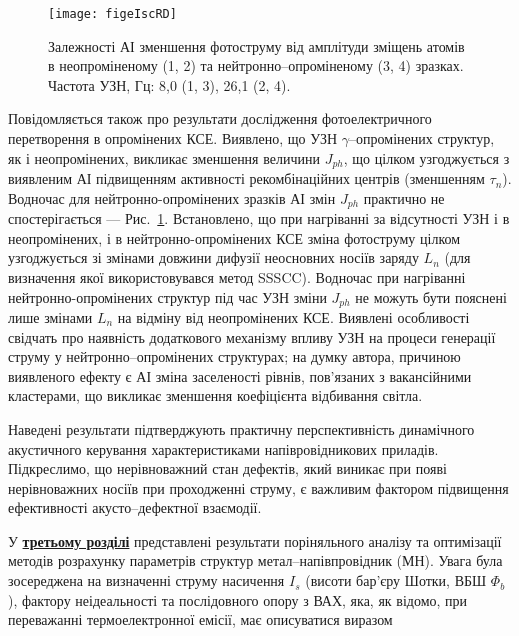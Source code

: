 \documentclass[a5paper,10pt,twoside,openany,article]{memoir} %
\begin{document}
\begin{figure}[hb]
\center
\texttt{[image: figeIscRD]}
\caption{\label{figeIscRD}
Залежності АІ зменшення фотоструму від
амплітуди зміщень атомів в неопроміненому (1, 2)
та нейтронно--опроміненому (3, 4) зразках.
Частота УЗН, Гц: 8,0 (1, 3),
26,1 (2, 4).
}%
\end{figure}
Повідомляється також про результати дослідження фотоелектричного перетворення в опромінених КСЕ.
Виявлено, що УЗН $\gamma$--опромінених структур, як і неопромінених, викликає зменшення величини $J_{ph}$, що цілком
узгоджується з виявленим АІ підвищенням активності рекомбінаційних центрів (зменшенням $\tau_n$).
Водночас для нейтронно-опромінених зразків АІ змін $J_{ph}$ практично не спостерігається --- Рис.~\ref{figeIscRD}.
Встановлено, що при нагріванні за відсутності УЗН і в неопромінених, і в нейтронно-опромінених КСЕ зміна фотоструму
цілком узгоджується зі змінами довжини дифузії неосновних носіїв заряду $L_n$ (для визначення якої використовувався метод SSSCC).
Водночас при нагріванні нейтронно-опромінених структур під час УЗН зміни $J_{ph}$ не можуть бути пояснені лише змінами $L_n$ на відміну від неопромінених КСЕ.
Виявлені особливості свідчать про наявність додаткового механізму впливу УЗН на процеси генерації струму у нейтронно--опромінених структурах;
на думку автора, причиною виявленого ефекту є АІ зміна заселеності рівнів, пов'язаних з вакансійними кластерами, що викликає зменшення коефіцієнта відбивання світла.


Наведені   результати  підтверджують  практичну перспективність динамічного акустичного керування характеристиками напівровідникових приладів.
Підкреслимо, що нерівноважний стан дефектів, який виникає при появі нерівноважних носіїв при проходженні струму, є важливим фактором підвищення ефективності акусто--дефектної взаємодії.

У  \underline{\textbf{третьому розділі}} представлені результати поріняльного аналізу та оптимізації методів розрахунку параметрів структур метал--напівпровідник (МН).
Увага була зосереджена на визначенні струму насичення  $I_s$ (висоти бар'єру Шотки, ВБШ $\Phi_b$), фактору неідеальності та послідовного опору з ВАХ, яка, як відомо, при переважанні термоелектронної емісії, має описуватися виразом
\end{document}
